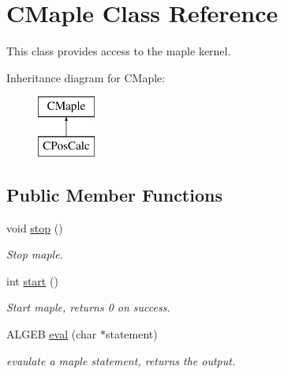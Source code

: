 \hypertarget{class_c_maple}{
\section{CMaple Class Reference}
\label{class_c_maple}
}


This class provides access to the maple kernel.  


Inheritance diagram for CMaple:\begin{figure}[H]
\begin{center}
\leavevmode
\includegraphics[height=2.000000cm]{class_c_maple}
\end{center}
\end{figure}
\subsection*{Public Member Functions}
\begin{DoxyCompactItemize}
\item 
\hypertarget{class_c_maple_a3a89fdf5121216413142e59ecde9a467}{
void \hyperlink{class_c_maple_a3a89fdf5121216413142e59ecde9a467}{stop} ()}
\label{class_c_maple_a3a89fdf5121216413142e59ecde9a467}

\begin{DoxyCompactList}\small\item\em Stop maple. \item\end{DoxyCompactList}\item 
\hypertarget{class_c_maple_abcf9b69a37815a97a53ac1acad945099}{
int \hyperlink{class_c_maple_abcf9b69a37815a97a53ac1acad945099}{start} ()}
\label{class_c_maple_abcf9b69a37815a97a53ac1acad945099}

\begin{DoxyCompactList}\small\item\em Start maple, returns 0 on success. \item\end{DoxyCompactList}\item 
ALGEB \hyperlink{class_c_maple_a28d25b1bed32ffe1f6147751a4cc7267}{eval} (char $\ast$statement)
\begin{DoxyCompactList}\small\item\em evaulate a maple statement, returns the output. \item\end{DoxyCompactList}\end{DoxyCompactItemize}
